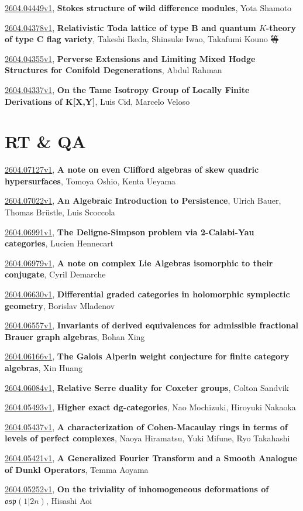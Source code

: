 \documentclass[9pt, a4paper]{article}
\theoremstyle{plain}
\theoremstyle{definition}
\theoremstyle{remark}
\newcommand{\arxiv}[3]{\href{https://arxiv.org/abs/#1}{#1}, \textbf{\textcolor{arxivblue}{#2}}, #3}
\begin{document}
\arxiv{2604.04449v1}{Stokes structure of wild difference modules}{Yota Shamoto}

\arxiv{2604.04378v1}{Relativistic Toda lattice of type B and quantum $K$-theory of type C flag variety}{Takeshi Ikeda, Shinsuke Iwao, Takafumi Kouno 等}

\arxiv{2604.04355v1}{Perverse Extensions and Limiting Mixed Hodge Structures for Conifold Degenerations}{Abdul Rahman}

\arxiv{2604.04337v1}{On the Tame Isotropy Group of Locally Finite Derivations of K[X,Y]}{Luis Cid, Marcelo Veloso}


\section{RT \& QA}
\arxiv{2604.07127v1}{A note on even Clifford algebras of skew quadric hypersurfaces}{Tomoya Oshio, Kenta Ueyama}

\arxiv{2604.07022v1}{An Algebraic Introduction to Persistence}{Ulrich Bauer, Thomas Brüstle, Luis Scoccola}

\arxiv{2604.06991v1}{The Deligne-Simpson problem via 2-Calabi-Yau categories}{Lucien Hennecart}

\arxiv{2604.06979v1}{A note on complex Lie Algebras isomorphic to their conjugate}{Cyril Demarche}

\arxiv{2604.06630v1}{Differential graded categories in holomorphic symplectic geometry}{Borislav Mladenov}

\arxiv{2604.06557v1}{Invariants of derived equivalences for admissible fractional Brauer graph algebras}{Bohan Xing}

\arxiv{2604.06166v1}{The Galois Alperin weight conjecture for finite category algebras}{Xin Huang}

\arxiv{2604.06084v1}{Relative Serre duality for Coxeter groups}{Colton Sandvik}

\arxiv{2604.05493v1}{Higher exact dg-categories}{Nao Mochizuki, Hiroyuki Nakaoka}

\arxiv{2604.05437v1}{A characterization of Cohen-Macaulay rings in terms of levels of perfect complexes}{Naoya Hiramatsu, Yuki Mifune, Ryo Takahashi}

\arxiv{2604.05421v1}{A Generalized Fourier Transform and a Smooth Analogue of Dunkl Operators}{Temma Aoyama}

\arxiv{2604.05252v1}{On the triviality of inhomogeneous deformations of $\mathfrak{osp}(1|2n)$}{Hisashi Aoi}
\end{document}
